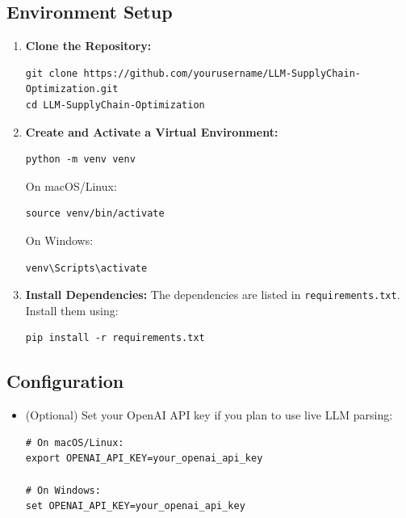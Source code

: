 \documentclass[11pt]{article}
\begin{document}
\subsection*{Environment Setup}
\begin{enumerate}[label=\arabic*.]
    \item \textbf{Clone the Repository:}
    \begin{verbatim}
git clone https://github.com/yourusername/LLM-SupplyChain-Optimization.git
cd LLM-SupplyChain-Optimization
    \end{verbatim}
    \item \textbf{Create and Activate a Virtual Environment:}
    \begin{verbatim}
python -m venv venv
    \end{verbatim}
    On macOS/Linux:
    \begin{verbatim}
source venv/bin/activate
    \end{verbatim}
    On Windows:
    \begin{verbatim}
venv\Scripts\activate
    \end{verbatim}
    \item \textbf{Install Dependencies:}  
    The dependencies are listed in \texttt{requirements.txt}. Install them using:
    \begin{verbatim}
pip install -r requirements.txt
    \end{verbatim}
\end{enumerate}

\subsection*{Configuration}
\begin{itemize}
    \item (Optional) Set your OpenAI API key if you plan to use live LLM parsing:
    \begin{verbatim}
# On macOS/Linux:
export OPENAI_API_KEY=your_openai_api_key

# On Windows:
set OPENAI_API_KEY=your_openai_api_key
    \end{verbatim}
\end{itemize}
\end{document}
